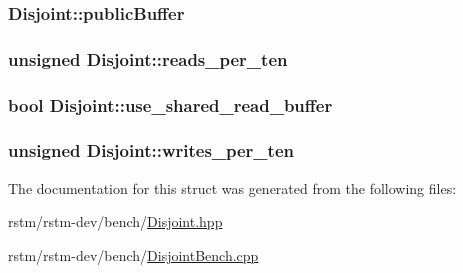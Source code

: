 \hypertarget{structDisjoint_ae391e9de469259ffa06f1a680fa7ba97}{
\subsubsection[{public\-Buffer}]{ Disjoint\-::public\-Buffer}}\label{structDisjoint_ae391e9de469259ffa06f1a680fa7ba97}
\hypertarget{structDisjoint_a4df2467d5cad8cd5aca6726d1565bd0e}{
\subsubsection[{reads\-\_\-per\-\_\-ten}]{\setlength{\rightskip}{0pt plus 5cm}unsigned Disjoint\-::reads\-\_\-per\-\_\-ten}}\label{structDisjoint_a4df2467d5cad8cd5aca6726d1565bd0e}
\hypertarget{structDisjoint_ae06e538e8e6d7880a7db67d6d6d610df}{
\subsubsection[{use\-\_\-shared\-\_\-read\-\_\-buffer}]{\setlength{\rightskip}{0pt plus 5cm}bool Disjoint\-::use\-\_\-shared\-\_\-read\-\_\-buffer}}\label{structDisjoint_ae06e538e8e6d7880a7db67d6d6d610df}
\hypertarget{structDisjoint_a1c463cc08d167c5706612e8884827d70}{
\subsubsection[{writes\-\_\-per\-\_\-ten}]{\setlength{\rightskip}{0pt plus 5cm}unsigned Disjoint\-::writes\-\_\-per\-\_\-ten}}\label{structDisjoint_a1c463cc08d167c5706612e8884827d70}


The documentation for this struct was generated from the following files\-:\begin{DoxyCompactItemize}
\item 
rstm/rstm-\/dev/bench/\hyperlink{Disjoint_8hpp}{Disjoint.\-hpp}\item 
rstm/rstm-\/dev/bench/\hyperlink{DisjointBench_8cpp}{Disjoint\-Bench.\-cpp}\end{DoxyCompactItemize}
